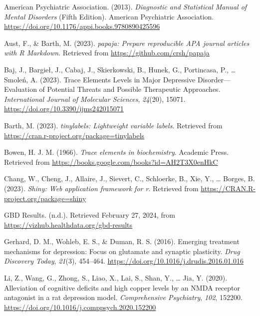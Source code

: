 \documentclass[
  man]{apa6}
\newlength{\cslhangindent}
\newlength{\cslentryspacingunit} %
\newenvironment{CSLReferences}[2] %
 {%
  \setlength{\parindent}{0pt}
  \ifodd #1
  \let\oldpar\par
  \def\par{\hangindent=\cslhangindent\oldpar}
  \fi
  \setlength{\parskip}{#2\cslentryspacingunit}
 }%
 {}
\begin{document}
\hypertarget{refs}{}
\begin{CSLReferences}{1}{0}
\leavevmode{}%
American Psychiatric Association. (2013). \emph{Diagnostic and {Statistical Manual} of {Mental Disorders}} (Fifth Edition). {American Psychiatric Association}. \url{https://doi.org/10.1176/appi.books.9780890425596}

\leavevmode{}%
Aust, F., \& Barth, M. (2023). \emph{{papaja}: {Prepare} reproducible {APA} journal articles with {R Markdown}}. Retrieved from \url{https://github.com/crsh/papaja}

\leavevmode{}%
Baj, J., Bargieł, J., Cabaj, J., Skierkowski, B., Hunek, G., Portincasa, P., \ldots{} Smoleń, A. (2023). Trace {Elements Levels} in {Major Depressive Disorder}---{Evaluation} of {Potential Threats} and {Possible Therapeutic Approaches}. \emph{International Journal of Molecular Sciences}, \emph{24}(20), 15071. \url{https://doi.org/10.3390/ijms242015071}

\leavevmode{}%
Barth, M. (2023). \emph{{tinylabels}: Lightweight variable labels}. Retrieved from \url{https://cran.r-project.org/package=tinylabels}

\leavevmode{}%
Bowen, H. J. M. (1966). \emph{Trace elements in biochemistry}. {Academic Press}. Retrieved from \url{https://books.google.com/books?id=AH2T3X0enHkC}

\leavevmode{}%
Chang, W., Cheng, J., Allaire, J., Sievert, C., Schloerke, B., Xie, Y., \ldots{} Borges, B. (2023). \emph{Shiny: Web application framework for r}. Retrieved from \url{https://CRAN.R-project.org/package=shiny}

\leavevmode{}%
{GBD Results}. (n.d.). Retrieved February 27, 2024, from \url{https://vizhub.healthdata.org/gbd-results}

\leavevmode{}%
Gerhard, D. M., Wohleb, E. S., \& Duman, R. S. (2016). Emerging treatment mechanisms for depression: Focus on glutamate and synaptic plasticity. \emph{Drug Discovery Today}, \emph{21}(3), 454--464. \url{https://doi.org/10.1016/j.drudis.2016.01.016}

\leavevmode{}%
Li, Z., Wang, G., Zhong, S., Liao, X., Lai, S., Shan, Y., \ldots{} Jia, Y. (2020). Alleviation of cognitive deficits and high copper levels by an {NMDA} receptor antagonist in a rat depression model. \emph{Comprehensive Psychiatry}, \emph{102}, 152200. \url{https://doi.org/10.1016/j.comppsych.2020.152200}


\end{CSLReferences}
\end{document}
